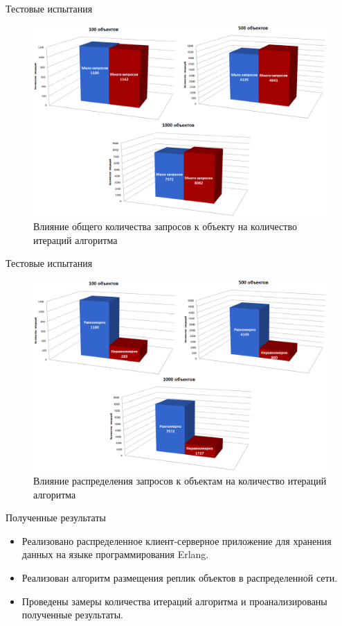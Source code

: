 \documentclass{beamer}
\begin{document}
\begin{frame}[fragile]{Тестовые испытания}
	\begin{figure}
		\includegraphics[scale=0.2]{img/histograms/req.png}
		\caption{Влияние общего количества запросов к объекту на количество итераций алгоритма}
	\end{figure}
\end{frame}

\begin{frame}[fragile]{Тестовые испытания}
	\begin{figure}
		\includegraphics[scale=0.2]{img/histograms/dist.png}
		\caption{Влияние распределения запросов к объектам на количество итераций алгоритма}
	\end{figure}
\end{frame}


\begin{frame}{Полученные результаты}
	\begin{itemize}
		\item Реализовано распределенное клиент-серверное приложение для хранения данных на языке программирования Erlang. 
    	\item Реализован алгоритм размещения реплик объектов в распределенной сети. 
    	\item Проведены замеры количества итераций алгоритма и проанализированы полученные результаты.
	\end{itemize}
\end{frame}
\end{document}
